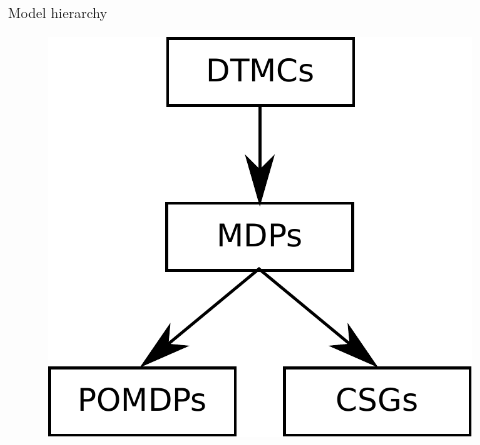 \documentclass[10pt]{beamer}
\begin{document}
\begin{frame}{Model hierarchy}

\begin{figure}
\centering
\includegraphics[height=0.7\textheight]{images/model_hierarchy.pdf}
\end{figure}

\end{frame}
\end{document}
